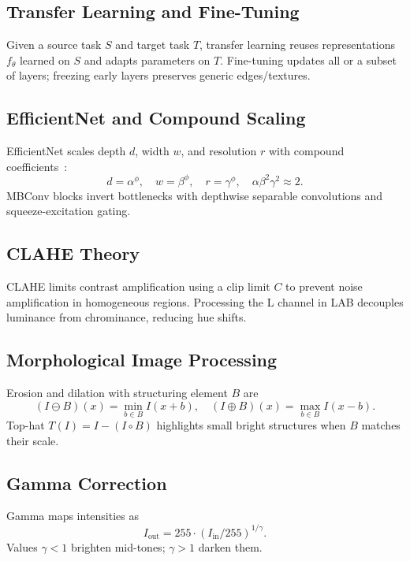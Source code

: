 \documentclass[10pt, conference]{IEEEtran}
\begin{document}
\subsection{Transfer Learning and Fine-Tuning}
Given a source task $S$ and target task $T$, transfer learning reuses representations $f_\theta$ learned on $S$ and adapts parameters on $T$. Fine-tuning updates all or a subset of layers; freezing early layers preserves generic edges/textures.

\subsection{EfficientNet and Compound Scaling}
EfficientNet scales depth $d$, width $w$, and resolution $r$ with compound coefficients~\cite{r27}:
\begin{equation}
d=\alpha^\phi,\quad w=\beta^\phi,\quad r=\gamma^\phi,\quad \alpha\beta^2\gamma^2\approx 2.
\label{eq:compound}
\end{equation}
MBConv blocks invert bottlenecks with depthwise separable convolutions and squeeze-excitation gating.

\subsection{CLAHE Theory}
CLAHE limits contrast amplification using a clip limit $C$ to prevent noise amplification in homogeneous regions. Processing the L channel in LAB decouples luminance from chrominance, reducing hue shifts.

\subsection{Morphological Image Processing}
Erosion and dilation with structuring element $B$ are
\begin{equation}
(I \ominus B)(x)=\min_{b\in B}I(x+b),\quad (I \oplus B)(x)=\max_{b\in B}I(x-b).
\label{eq:morph}
\end{equation}
Top-hat $T(I)=I-(I\circ B)$ highlights small bright structures when $B$ matches their scale.

\subsection{Gamma Correction}
Gamma maps intensities as
\begin{equation}
I_{\text{out}} = 255\cdot (I_{\text{in}}/255)^{1/\gamma}.
\label{eq:gamma}
\end{equation}
Values $\gamma<1$ brighten mid-tones; $\gamma>1$ darken them.
\end{document}
